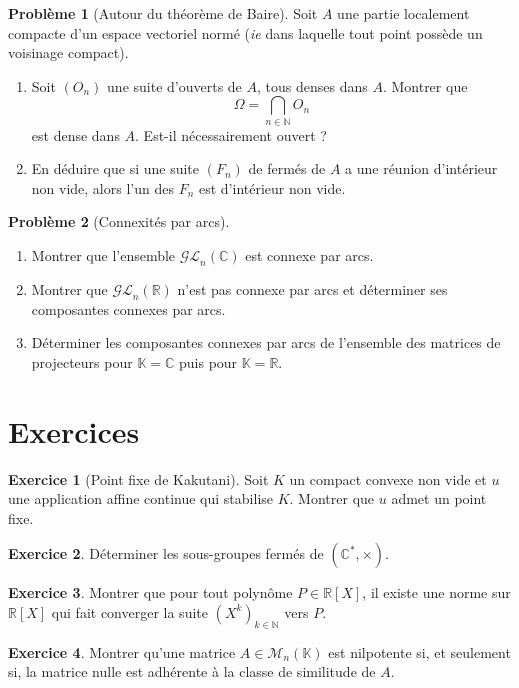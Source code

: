 \documentclass[french]{book}
\newcommand{\N}{\mathbb{N}}
\newcommand{\R}{\mathbb{R}}
\newcommand{\C}{\mathbb{C}}
\newcommand{\K}{\mathbb{K}}
\newcommand{\st}{^*}
\theoremstyle{definition}
\newtheorem{ex}{Exercice}[chapter]
\newtheorem{pro}{Problème}[chapter]
\theoremstyle{remark}
\begin{document}
\begin{pro}[Autour du théorème de Baire]
	Soit $A$ une partie localement compacte d'un espace vectoriel normé (\textit{ie} dans laquelle tout point possède un voisinage compact).
	\begin{enumerate}
		\item Soit $(O_n)$ une suite d'ouverts de $A$, tous denses dans $A$. Montrer que $$\Omega=\bigcap_{n\in\N} O_n$$ est dense dans $A$. Est-il nécessairement ouvert ?
		\item En déduire que si une suite $(F_n)$ de fermés de $A$ a une réunion d'intérieur non vide, alors l'un des $F_n$ est d'intérieur non vide.
	\end{enumerate}
\end{pro}

\begin{pro}[Connexités par arcs]
	\begin{enumerate}
		\item Montrer que l'ensemble $\mathcal{GL}_n(\C)$ est connexe par arcs.
		\item Montrer que $\mathcal{GL}_n(\R)$ n'est pas connexe par arcs et déterminer ses composantes connexes par arcs.
		\item Déterminer les composantes connexes par arcs de l'ensemble des matrices de projecteurs pour $\K=\C$ puis pour $\K=\R$.
	\end{enumerate}
\end{pro}

\section{Exercices}

\begin{ex}[Point fixe de Kakutani]
	Soit $K$ un compact convexe non vide et $u$ une application affine continue qui stabilise $K$. Montrer que $u$ admet un point fixe.
\end{ex}

\begin{ex}
	Déterminer les sous-groupes fermés de $(\C\st,\times)$.
\end{ex}

\begin{ex}
	Montrer que pour tout polynôme $P\in\R[X]$, il existe une norme sur $\R[X]$ qui fait converger la suite $(X^k)_{k\in\N}$ vers $P$.
\end{ex}

\begin{ex}
	Montrer qu'une matrice $A\in\mathcal{M}_n(\K)$ est nilpotente si, et seulement si, la matrice nulle est adhérente à la classe de similitude de $A$.
\end{ex}
\end{document}
